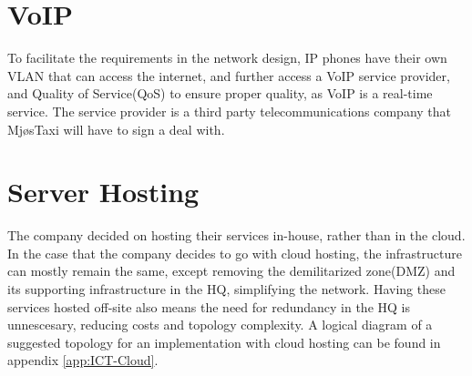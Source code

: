 \section{VoIP}
To facilitate the requirements in the network design, IP phones have their own VLAN that can access the internet, and further access a VoIP service provider, and Quality of Service(QoS) to ensure proper quality, as VoIP is a real-time service. 
The service provider is a third party telecommunications company that MjøsTaxi will have to sign a deal with.

\section{Server Hosting}
The company decided on hosting their services in-house, rather than in the cloud.
In the case that the company decides to go with cloud hosting, the infrastructure can mostly remain the same, except removing the demilitarized zone(DMZ) and its supporting infrastructure in the HQ, simplifying the network.
Having these services hosted off-site also means the need for redundancy in the HQ is unnescesary, reducing costs and topology complexity.
A logical diagram of a suggested topology for an implementation with cloud hosting can be found in appendix \ref{app:ICT-Cloud}.





